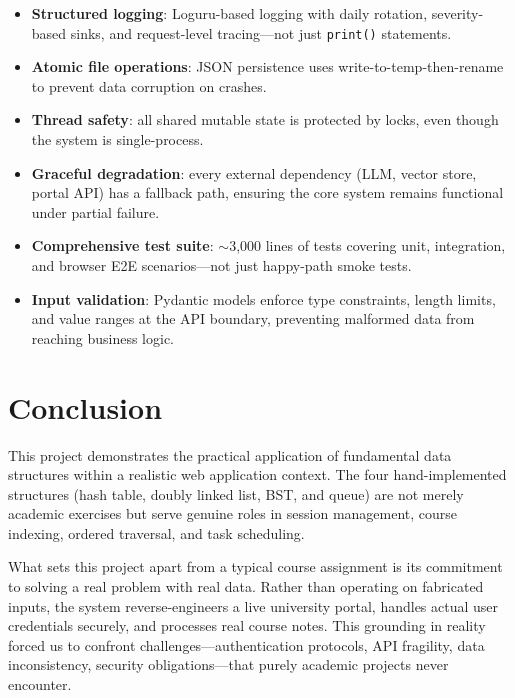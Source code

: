 \documentclass[12pt,a4paper]{article}
\begin{document}
\begin{itemize}[nosep]
    \item \textbf{Structured logging}: Loguru-based logging with daily rotation, severity-based sinks, and request-level tracing---not just \texttt{print()} statements.
    \item \textbf{Atomic file operations}: JSON persistence uses write-to-temp-then-rename to prevent data corruption on crashes.
    \item \textbf{Thread safety}: all shared mutable state is protected by locks, even though the system is single-process.
    \item \textbf{Graceful degradation}: every external dependency (LLM, vector store, portal API) has a fallback path, ensuring the core system remains functional under partial failure.
    \item \textbf{Comprehensive test suite}: $\sim$3,000 lines of tests covering unit, integration, and browser E2E scenarios---not just happy-path smoke tests.
    \item \textbf{Input validation}: Pydantic models enforce type constraints, length limits, and value ranges at the API boundary, preventing malformed data from reaching business logic.
\end{itemize}

\section{Conclusion}
\label{sec:conclusion}

This project demonstrates the practical application of fundamental data structures within a realistic web application context. The four hand-implemented structures (hash table, doubly linked list, BST, and queue) are not merely academic exercises but serve genuine roles in session management, course indexing, ordered traversal, and task scheduling.

What sets this project apart from a typical course assignment is its commitment to solving a real problem with real data. Rather than operating on fabricated inputs, the system reverse-engineers a live university portal, handles actual user credentials securely, and processes real course notes. This grounding in reality forced us to confront challenges---authentication protocols, API fragility, data inconsistency, security obligations---that purely academic projects never encounter.
\end{document}
